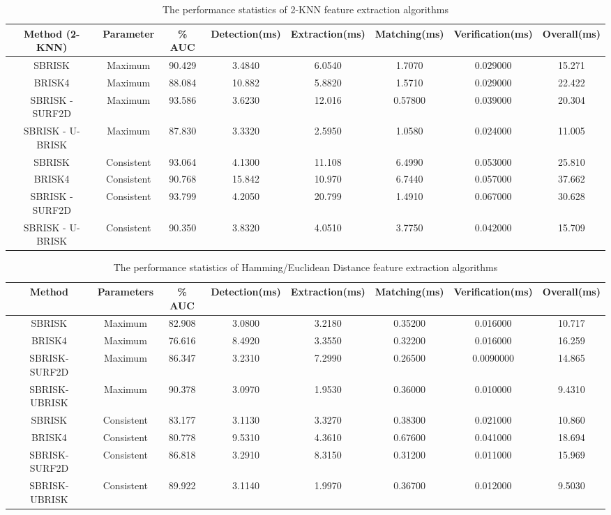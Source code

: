 \documentclass{article}
\begin{document}
\begin{table}
\centering
\caption{The performance statistics of 2-KNN feature extraction algorithms}
\footnotesize
\begin{tabular}{|c|c|c|c|c|c|c|c|}
\hline 
\textbf{Method (2-KNN)} & Parameter & \% AUC & Detection(ms) & Extraction(ms) & Matching(ms) & Verification(ms) & Overall(ms)\tabularnewline
\hline 
\hline 
SBRISK & Maximum & 90.429 & 3.4840 & 6.0540 & 1.7070 & 0.029000 & 15.271\tabularnewline
\hline 
BRISK4 & Maximum & 88.084 & 10.882 & 5.8820 & 1.5710 & 0.029000 & 22.422\tabularnewline
\hline 
SBRISK - SURF2D & Maximum & 93.586 & 3.6230 & 12.016 & 0.57800 & 0.039000 & 20.304\tabularnewline
\hline 
SBRISK - U-BRISK & Maximum & 87.830 & 3.3320 & 2.5950 & 1.0580 & 0.024000 & 11.005\tabularnewline
\hline 
SBRISK & Consistent & 93.064 & 4.1300 & 11.108 & 6.4990 & 0.053000 & 25.810\tabularnewline
\hline 
BRISK4 & Consistent & 90.768 & 15.842 & 10.970 & 6.7440 & 0.057000 & 37.662\tabularnewline
\hline 
SBRISK - SURF2D & Consistent & 93.799 & 4.2050 & 20.799 & 1.4910 & 0.067000 & 30.628\tabularnewline
\hline 
SBRISK - U-BRISK & Consistent & 90.350 & 3.8320 & 4.0510 & 3.7750 & 0.042000 & 15.709\tabularnewline
\hline 
\end{tabular}


\label{tab:overallknn}
\end{table}

\begin{table}
\centering
\caption{The performance statistics of Hamming/Euclidean Distance feature extraction algorithms}
\footnotesize
\begin{tabular}{|c|c|c|c|c|c|c|c|}
\hline 
Method & Parameters & \% AUC & Detection(ms) & Extraction(ms) & Matching(ms) & Verification(ms) & Overall(ms)\tabularnewline
\hline 
\hline 
SBRISK & Maximum & 82.908 & 3.0800 & 3.2180 & 0.35200 & 0.016000 & 10.717\tabularnewline
\hline 
BRISK4 & Maximum & 76.616 & 8.4920 & 3.3550 & 0.32200 & 0.016000 & 16.259\tabularnewline
\hline 
SBRISK-SURF2D & Maximum & 86.347 & 3.2310 & 7.2990 & 0.26500 & 0.0090000 & 14.865\tabularnewline
\hline 
SBRISK-UBRISK & Maximum & 90.378 & 3.0970 & 1.9530 & 0.36000 & 0.010000 & 9.4310\tabularnewline
\hline 
SBRISK & Consistent & 83.177 & 3.1130 & 3.3270 & 0.38300 & 0.021000 & 10.860\tabularnewline
\hline 
BRISK4 & Consistent & 80.778 & 9.5310 & 4.3610 & 0.67600 & 0.041000 & 18.694\tabularnewline
\hline 
SBRISK-SURF2D & Consistent & 86.818 & 3.2910 & 8.3150 & 0.31200 & 0.011000 & 15.969\tabularnewline
\hline 
SBRISK-UBRISK & Consistent & 89.922 & 3.1140 & 1.9970 & 0.36700 & 0.012000 & 9.5030\tabularnewline
\hline 
\end{tabular}
\label{tab:overallhammingeuclidean}
\end{table}
\end{document}

